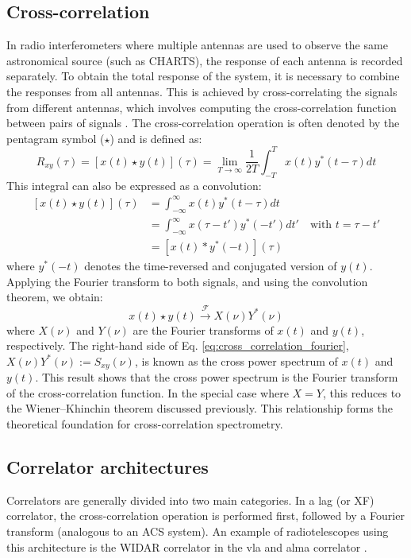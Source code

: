 \subsection{Cross-correlation}
\label{sec:cross_correlation}
In radio interferometers where multiple antennas are used to observe the same astronomical source (such as CHARTS), the response of each antenna is recorded separately. To obtain the total response of the system, it is necessary to combine the responses from all antennas. This is achieved by cross-correlating the signals from different antennas, which involves computing the cross-correlation function between pairs of signals \citep{thompson2017interferometry}. 
The cross-correlation operation is often denoted by the pentagram symbol ($\star$) and is defined as:
\begin{equation}
	R_{xy}(\tau)=\left[x(t) \star y(t)\right](\tau) = \lim_{T \to \infty} \frac{1}{2T} \int_{-T}^{T} x(t) y^*(t - \tau) dt
\end{equation}
This integral can also be expressed as a convolution:
\begin{align}
	\left[x(t) \star y(t)\right](\tau)
	&= \int_{-\infty}^{\infty} x(t) y^*(t - \tau) dt \\
	&= \int_{-\infty}^{\infty} x(\tau - t') y^*(-t') dt' \quad \text{with } t = \tau - t'\\
	&= \left[x(t) * y^*(-t)\right](\tau)
	\label{eq:cross_correlation}
\end{align}
where $y^*(-t)$ denotes the time-reversed and conjugated version of $y(t)$. Applying the Fourier transform to both signals, and using the convolution theorem, we obtain:
\begin{equation}
	x(t) \star y(t) \xrightarrow{\mathcal{F}} X(\nu) Y^*(\nu)
	\label{eq:cross_correlation_fourier}
\end{equation}
where $X(\nu)$ and $Y(\nu)$ are the Fourier transforms of $x(t)$ and $y(t)$, respectively. The right-hand side of Eq. \ref{eq:cross_correlation_fourier}, $X(\nu) Y^*(\nu):=S_{xy}(\nu)$, is known as the cross power spectrum of $x(t)$ and $y(t)$. This result shows that the cross power spectrum is the Fourier transform of the cross-correlation function. In the special case where $X = Y$, this reduces to the Wiener–Khinchin theorem discussed previously. This relationship forms the theoretical foundation for cross-correlation spectrometry.

\subsection{Correlator architectures}
\label{sec:spectrometer_architectures}
Correlators are generally divided into two main categories. In a lag (or XF) correlator, the cross-correlation operation is performed first, followed by a Fourier transform (analogous to an ACS system). An example of radiotelescopes using this architecture is the WIDAR correlator in the \Gls{vla} \citep{Perley_2009} and \Gls{alma} correlator \citep{ALMA_correlator}.

